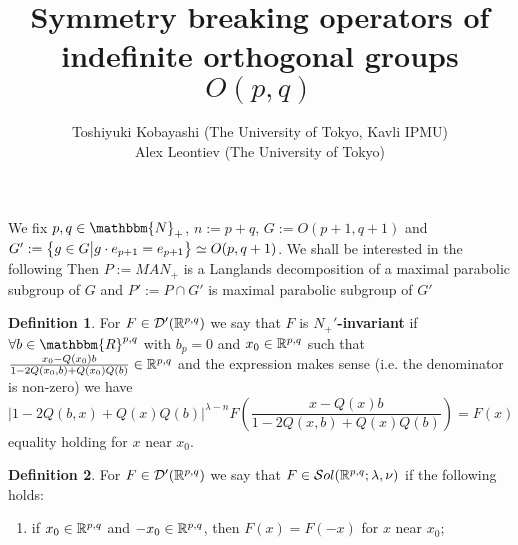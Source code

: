 \documentclass[10pt]{article} %
\newcommand{\assign}{:=}
\newcommand{\sol}{\mathcal{S}ol(\R^{p,q};\lambda,\nu)}
\theoremstyle{definition}
\newtheorem{definition}{Definition}
\newcommand{\tmtextbf}[1]{{\bfseries{#1}}}
\begin{document}
\title{Symmetry breaking operators of indefinite orthogonal groups $O(p,q)$}

  \author{Toshiyuki Kobayashi (The University of Tokyo, Kavli IPMU)\\
  Alex Leontiev (The University of Tokyo)}




  \maketitle

  \begin{versiona}
We fix $p, q \in \mathbbm{N}_+$, $n \assign p + q$, $G \assign O (p +
1, q + 1)$ and $G' \assign \mysetn{g \in
G}{g \cdot e_{p + 1} = e_{p + 1}} \simeq O (p, q + 1)$. We shall be interested
in the following
Then $P:=MAN_{+}$ is a Langlands decomposition of a maximal parabolic subgroup of $G$
and $P':=P\cap G'$ is maximal parabolic subgroup of $G'$

\begin{definition}
	\label{def1}For $F \in \mathcal{D}' (\mathbb{R}^{p,q})$
  we say that $F$ is
  \tmtextbf{$N_+'$-invariant} if $\forall b \in \mathbbm{R}^{p, q}$
  with $b_p = 0$ and $x_0 \in \mathbb{R}^{p,q}$ such that $\frac{x_0 - Q (x_0) b}{1 - 2 Q
  (x_0, b) + Q (x_0) Q (b)} \in \mathbb{R}^{p,q}$ and the expression makes sense (i.e. the
  denominator is non-zero) we have
  \begin{equation*}
    \label{eq-Nequiv} | 1 - 2 Q (b, x) + Q (x) Q (b) |^{\lambda - n} F \left(
    \frac{x - Q (x) b}{1 - 2 Q (x, b) + Q (x) Q (b)} \right) = F (x)
  \end{equation*}
  equality holding for $x$ near $x_0$.
\end{definition}

\begin{definition}
	\label{def2}For $F \in \mathcal{D}' (\mathbb{R}^{p,q})$
	we say that $F \in \sol$ if the
  following holds:
  \begin{enumerate}
    \item if $x_0 \in \mathbb{R}^{p,q}$ and $- x_0 \in \mathbb{R}^{p,q}$, then $F (x) = F (- x)$ for $x$
    near $x_0$;
    

\end{enumerate}
\end{definition}
\end{versiona}
\end{document}
